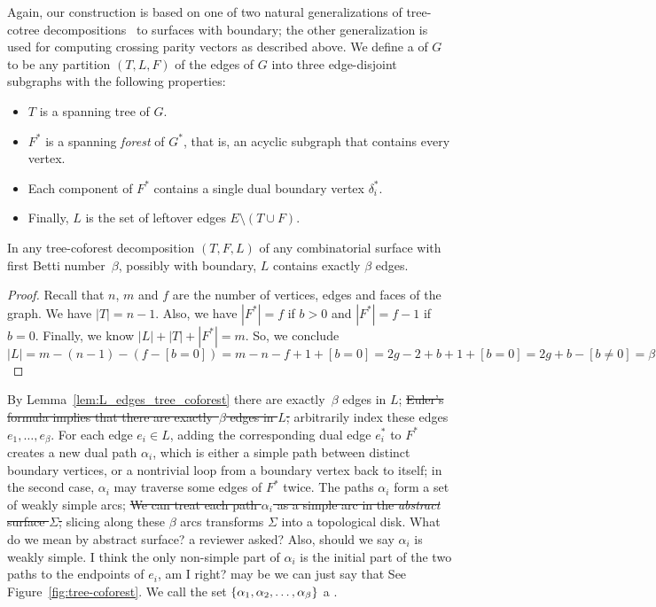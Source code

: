 \documentclass[letterpaper,review]{siamart190516}
\def\dualarc{\alpha}
\def\modified#1{\color{blue}#1 \color{black}}
\begin{document}
Again, our construction is based on one of two natural generalizations of tree-cotree
decompositions~\cite{e-dgteg-03} to surfaces with boundary; the other generalization is used for
computing crossing parity vectors as described above.
We define a  of $G$ to be any partition $(T, L, F)$ of the edges of $G$ into three edge-disjoint subgraphs with the following properties:
\begin{itemize}\itemsep0pt
\item $T$ is a spanning tree of $G$.
\item $F^*$ is a spanning \emph{forest} of $G^*$, that is, an acyclic subgraph that contains every vertex.
\item Each component of $F^*$ contains a single dual boundary vertex $\delta_i^*$.
\item Finally, $L$ is the set of leftover edges $E \setminus (T\cup F)$.
\end{itemize}
%
\begin{lemma}
\label{lem:L_edges_tree_coforest}
In any tree-coforest decomposition $(T, F, L)$ of any combinatorial surface with first Betti number~$\beta$, possibly with boundary, $L$ contains exactly $\beta$ edges.
\end{lemma}
\begin{proof}
Recall that $n$, $m$ and $f$ are the number of vertices, edges and faces of the graph.
We have $|T| = n-1$.  Also, we have $|F^*| = f $ if $b > 0$ and $|F^*| = f -1$ if $b = 0$.  Finally, we know $|L| + |T| + |F^*| = m$.
So, we conclude
\[
|L| = m - (n-1) - (f - [b=0]) = m - n - f + 1 + [b=0] = 2g - 2 + b + 1 + [b = 0] = 2g + b - [b\neq 0] = \beta 
\]
\end{proof}

\modified{
By Lemma~\ref{lem:L_edges_tree_coforest} there are exactly~$\beta$ edges in $L$;
}
\sout{Euler's formula implies that there are exactly~$\beta$ edges in $L$;} arbitrarily index these edges $e_1, \dots, e_\beta$.  For each edge $e_i\in L$, adding the corresponding dual edge $e_i^*$ to $F^*$ creates a new dual path $\dualarc_i$, which is either a simple path between distinct boundary vertices, or a nontrivial loop from a boundary vertex back to itself; in the second case, $\dualarc_i$ may traverse some edges of $F^*$ twice.  
\modified{The paths $\dualarc_i$ form a set of weakly simple arcs;}
\sout{We can treat each path $\dualarc_i$ as a simple arc in the \emph{abstract} surface $\Sigma$;} slicing along these $\beta$ arcs transforms $\Sigma$ into a topological disk. \modified{What do we mean by abstract surface? a reviewer asked? Also, should we say $\alpha_i$ is weakly simple.  I think the only non-simple part of $\alpha_i$ is the initial part of the two paths to the endpoints of $e_i$, am I right? may be we can just say that}
See Figure~\ref{fig:tree-coforest}.  We call the set $\set{\dualarc_1, \dualarc_2, \dots, \dualarc_\beta}$ a .
\end{document}
